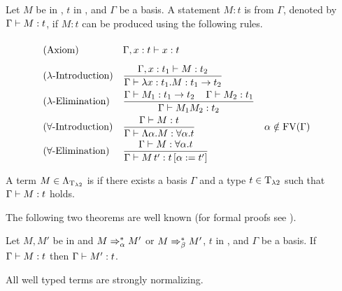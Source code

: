 \begin{definition}\label{def.2.10}
Let $M$ be in \lambdaTerms{}, $t$ in \lambdaTypes, and $\Gamma$ be a basis. A statement $M:t$ is  from $\Gamma$, denoted by $\Gamma\vdash M:t$, if $M:t$ can be produced using the following rules.
\begin{mdframed} 
	\begingroup
	\addtolength{\jot}{0.3cm}
	\begin{align*}
		&(\text{Axiom}) &&\Gamma,x:t\lambdaModels x:t\vphantom{\frac{t_1}{t_1}}\\
		&(\lambda\text{-Introduction}) &&\frac{\Gamma,x:t_1\lambdaModels M:t_2}{\Gamma\lambdaModels \lambda x:t_1.M:t_1\to t_2}\\
		&(\lambda\text{-Elimination}) &&\frac{\Gamma\lambdaModels M_1:t_1\to t_2 \hspace{0.4cm}\Gamma\lambdaModels M_2:t_1}{\Gamma\lambdaModels M_1M_2:t_2}\\
& (\forall\text{-Introduction}) &   & \frac{\Gamma\lambdaModels M:t}{\Gamma\lambdaModels \Lambda\alpha.M:\forall\alpha.t}                 &   & \alpha\notin\FV(\Gamma) \\
& (\forall\text{-Elimination})  &   & \frac{\Gamma\lambdaModels M:\forall\alpha.t }{\Gamma\lambdaModels M\,t':t\left[ \alpha:=t'\right] } 
	\end{align*}
	\endgroup
\end{mdframed}
\end{definition}

\begin{definition}\label{def.2.11}
A term $M\in\Lambda_{\text{T}_{\lambda2}}$ is  if there exists a basis $\Gamma$ and a type $t\in\text{T}_{\lambda2}$ such that $\Gamma\vdash M:t$ holds.
\end{definition}

The following two theorems are well known (for formal proofs see \cite{1}).

\begin{theorem}\label{the.2.12}
Let $M,M'$ be in \lambdaTerms{} and $M\Rightarrow_\alpha^* M'$ or $M\Rightarrow_\beta^* M'$, $t$ in \lambdaTypes, and $\Gamma$ be a basis. If $\Gamma\vdash M:t$ then $\Gamma\vdash M':t$.
\end{theorem}

\begin{theorem}\label{the.2.13}
All well typed \lambdaTwo{} terms are strongly normalizing.
\end{theorem}

